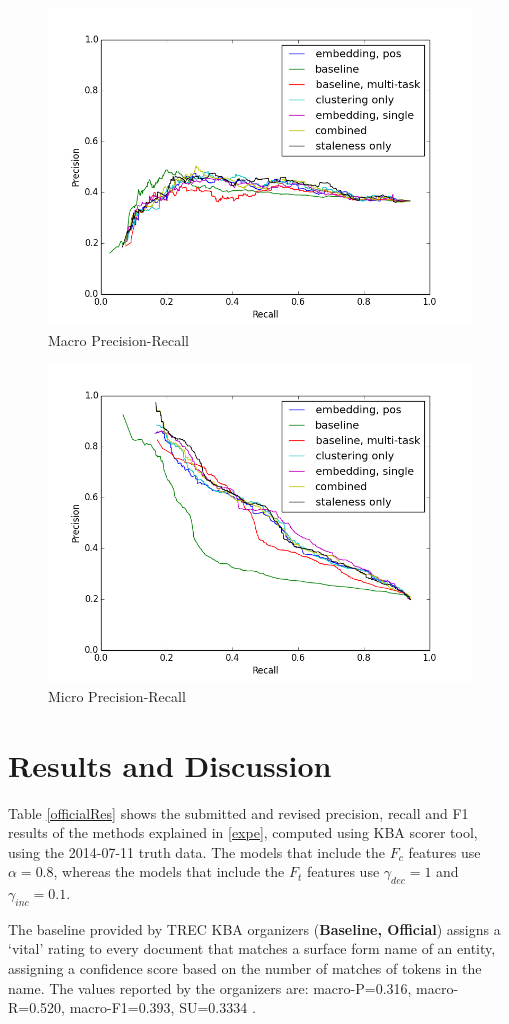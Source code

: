 \documentclass{article}
\begin{document}
\begin{figure}[tb]
\centering
\includegraphics[width=.45\textwidth,clip=true,trim=10mm 0mm 15mm 8mm]{fig/macroPrecisionRecall.png}
\caption{Macro Precision-Recall}
\label{macroPrecRecall}
\end{figure}

\begin{figure}[tb]
\centering
\includegraphics[width=.45\textwidth,clip=true,trim=10mm 0mm 15mm 8mm]{fig/microPrecisionRecall.png}
\caption{Micro Precision-Recall}
\label{microPrecRecall}
\end{figure}

\section{Results and Discussion}

Table \ref{officialRes} shows the submitted and revised precision, recall and F1 results of the methods explained in \ref{expe}, computed using KBA scorer tool, using the 2014-07-11 truth data. The models that include the $F_c$ features use $\alpha=0.8$, whereas the models that include the $F_t$ features use $\gamma_{dec}=1$ and $\gamma_{inc}=0.1$.

The baseline provided by TREC KBA organizers ({\textbf{Baseline, Official}}) assigns a `vital' rating to every document that matches a surface form name of an entity, assigning a confidence score based on the number of matches of tokens in the name. The values reported by the organizers are: macro-P=0.316, macro-R=0.520, macro-F1=0.393, SU=0.3334 \cite{frank14:overview}.
\end{document}
